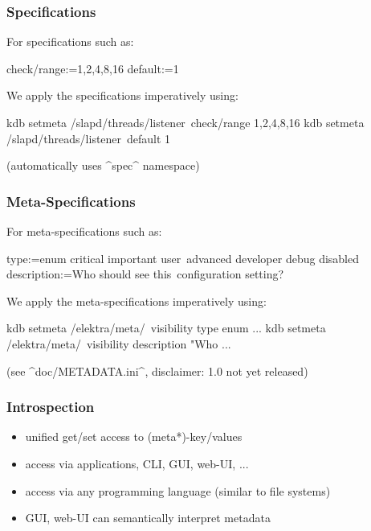 \begin{frame}[fragile]
	\frametitle{Specifications}
	For specifications such as:

	\begin{code}
	  check/range:=1,2,4,8,16
	  default:=1
	\end{code}

	We apply the specifications imperatively using:

	\begin{code}[language=bash,morekeywords={setmeta}]
	kdb setmeta /slapd/threads/listener\
		check/range 1,2,4,8,16
	kdb setmeta /slapd/threads/listener\
	       	default 1
	\end{code}

	(automatically uses ^spec^ namespace)
\end{frame}

\begin{frame}[fragile]
	\frametitle{Meta-Specifications}
	For meta-specifications such as:

	\small
	\begin{code}
	[visibility]
	type:=enum critical important user\
	      advanced developer debug disabled
	description:=Who should see this\
	     configuration setting?
	\end{code}

	We apply the meta-specifications imperatively using:

	\begin{code}[language=bash,morekeywords={setmeta}]
	kdb setmeta /elektra/meta/\
		visibility type enum ...
	kdb setmeta /elektra/meta/\
		visibility description "Who ...
	\end{code}

	(see ^doc/METADATA.ini^, disclaimer: 1.0 not yet released)
\end{frame}

\begin{frame}
	\frametitle{Introspection}
	\begin{itemize}
	\item unified get/set access to (meta*)-key/values
	\item access via applications, CLI, GUI, web-UI, ...
	\item access via any programming language (similar to file systems)
	\item GUI, web-UI can semantically interpret metadata
	\end{itemize}
\end{frame}

